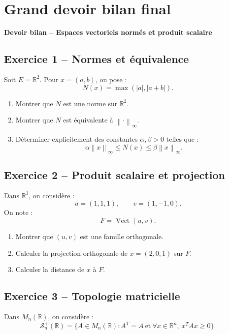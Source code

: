 \documentclass[11pt,a4paper]{article}
\newcommand{\R}{\mathbb R}
\newcommand{\norme}[1]{\left\lVert #1 \right\rVert}
\newcommand{\Vect}{\operatorname{Vect}}
\begin{document}
\section{Grand devoir bilan final}

\begin{center}
\Large\textbf{Devoir bilan -- Espaces vectoriels normés et produit scalaire}
\end{center}

\subsection*{Exercice 1 -- Normes et équivalence}

Soit \(E=\R^2\). Pour \(x=(a,b)\), on pose :
\[
N(x)=\max(|a|,|a+b|).
\]

\begin{enumerate}
    \item Montrer que \(N\) est une norme sur \(\R^2\).
    \item Montrer que \(N\) est équivalente à \(\norme{\cdot}_\infty\).
    \item Déterminer explicitement des constantes \(\alpha,\beta>0\) telles que :
    \[
    \alpha\norme{x}_\infty\leq N(x)\leq \beta\norme{x}_\infty.
    \]
\end{enumerate}

\subsection*{Exercice 2 -- Produit scalaire et projection}

Dans \(\R^3\), on considère :
\[
u=(1,1,1),\qquad v=(1,-1,0).
\]
On note :
\[
F=\Vect(u,v).
\]

\begin{enumerate}
    \item Montrer que \((u,v)\) est une famille orthogonale.
    \item Calculer la projection orthogonale de \(x=(2,0,1)\) sur \(F\).
    \item Calculer la distance de \(x\) à \(F\).
\end{enumerate}

\subsection*{Exercice 3 -- Topologie matricielle}

Dans \(M_n(\R)\), on considère :
\[
\mathcal S_n^+(\R)=\{A\in M_n(\R): A^T=A\ \text{et}\ \forall x\in\R^n,\ x^TAx\geq0\}.
\]
\end{document}
